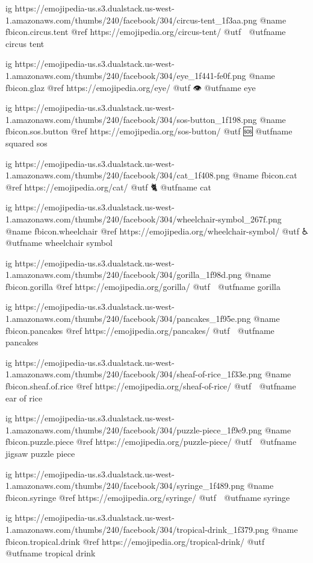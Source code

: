   ig https://emojipedia-us.s3.dualstack.us-west-1.amazonaws.com/thumbs/240/facebook/304/circus-tent_1f3aa.png
  @name fbicon.circus.tent
  @ref https://emojipedia.org/circus-tent/
  @utf 🎪
  @utfname circus tent

  ig https://emojipedia-us.s3.dualstack.us-west-1.amazonaws.com/thumbs/240/facebook/304/eye_1f441-fe0f.png
  @name fbicon.glaz
  @ref https://emojipedia.org/eye/
  @utf 👁
  @utfname eye

  ig https://emojipedia-us.s3.dualstack.us-west-1.amazonaws.com/thumbs/240/facebook/304/sos-button_1f198.png
  @name fbicon.sos.button
  @ref https://emojipedia.org/sos-button/
  @utf 🆘
  @utfname squared sos

  ig https://emojipedia-us.s3.dualstack.us-west-1.amazonaws.com/thumbs/240/facebook/304/cat_1f408.png
  @name fbicon.cat
  @ref https://emojipedia.org/cat/
  @utf 🐈
  @utfname cat

  ig https://emojipedia-us.s3.dualstack.us-west-1.amazonaws.com/thumbs/240/facebook/304/wheelchair-symbol_267f.png
  @name fbicon.wheelchair
  @ref https://emojipedia.org/wheelchair-symbol/
  @utf ♿
  @utfname wheelchair symbol

  ig https://emojipedia-us.s3.dualstack.us-west-1.amazonaws.com/thumbs/240/facebook/304/gorilla_1f98d.png
  @name fbicon.gorilla
  @ref https://emojipedia.org/gorilla/
  @utf 🦍
  @utfname gorilla

  ig https://emojipedia-us.s3.dualstack.us-west-1.amazonaws.com/thumbs/240/facebook/304/pancakes_1f95e.png
  @name fbicon.pancakes
  @ref https://emojipedia.org/pancakes/
  @utf 🥞
  @utfname pancakes

  ig https://emojipedia-us.s3.dualstack.us-west-1.amazonaws.com/thumbs/240/facebook/304/sheaf-of-rice_1f33e.png
  @name fbicon.sheaf.of.rice
  @ref https://emojipedia.org/sheaf-of-rice/
  @utf 🌾
  @utfname ear of rice

  ig https://emojipedia-us.s3.dualstack.us-west-1.amazonaws.com/thumbs/240/facebook/304/puzzle-piece_1f9e9.png
  @name fbicon.puzzle.piece
  @ref https://emojipedia.org/puzzle-piece/
  @utf 🧩
  @utfname jigsaw puzzle piece

  ig https://emojipedia-us.s3.dualstack.us-west-1.amazonaws.com/thumbs/240/facebook/304/syringe_1f489.png
  @name fbicon.syringe
  @ref https://emojipedia.org/syringe/
  @utf 💉
  @utfname syringe

  ig https://emojipedia-us.s3.dualstack.us-west-1.amazonaws.com/thumbs/240/facebook/304/tropical-drink_1f379.png
  @name fbicon.tropical.drink
  @ref https://emojipedia.org/tropical-drink/
  @utf 🍹
  @utfname tropical drink


